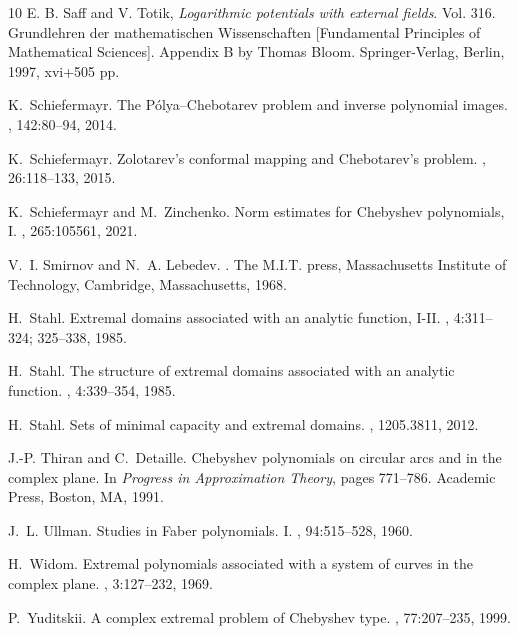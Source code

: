 \documentclass[12pt,oneside,reqno]{amsart}
\theoremstyle{definition}
\numberwithin{equation}{section}
\begin{document}
\begin{thebibliography}{10}
E. B. Saff and V. Totik, 
\newblock \emph{Logarithmic potentials with external fields}.
\newblock Vol. 316. Grundlehren der mathematischen Wissenschaften [Fundamental Principles of Mathematical Sciences]. Appendix B by Thomas Bloom. Springer-Verlag, Berlin, 1997, xvi+505 pp.

K.~Schiefermayr.
\newblock The {P}{\'o}lya--{C}hebotarev problem and inverse polynomial images.
, 142:80--94, 2014.

K.~Schiefermayr.
\newblock Zolotarev's conformal mapping and {C}hebotarev's problem.
, 26:118--133, 2015.

K.~Schiefermayr and M.~Zinchenko.
\newblock Norm estimates for {C}hebyshev polynomials, {I}.
, 265:105561, 2021.

V.~I. Smirnov and N.~A. Lebedev.
.
\newblock The M.I.T. press, Massachusetts Institute of Technology, Cambridge, Massachusetts, 1968.

H.~Stahl.
\newblock Extremal domains associated with an analytic function, {I-II}.
, 4:311--324; 325--338, 1985.

H.~Stahl.
\newblock The structure of extremal domains associated with an analytic function.
, 4:339--354, 1985.

H.~Stahl.
\newblock Sets of minimal capacity and extremal domains.
, 1205.3811, 2012.

J.-P. Thiran and C.~Detaille.
\newblock Chebyshev polynomials on circular arcs and in the complex plane.
\newblock In {\em Progress in Approximation Theory}, pages 771--786. Academic Press, Boston, MA, 1991.

J.~L. Ullman.
\newblock Studies in {F}aber polynomials. {I}.
, 94:515--528, 1960.

H.~Widom.
\newblock Extremal polynomials associated with a system of curves in the complex plane.
, 3:127--232, 1969.

P.~Yuditskii.
\newblock A complex extremal problem of {C}hebyshev type.
, 77:207--235, 1999.

\end{thebibliography}
\end{document}
